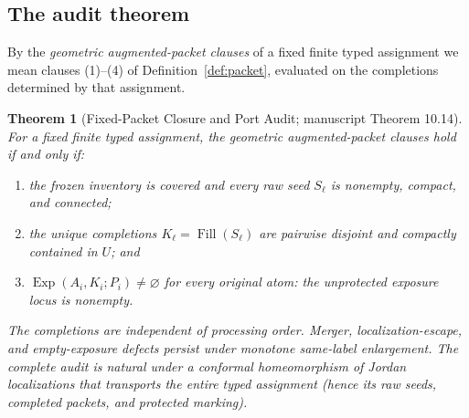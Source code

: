 \documentclass[11pt,reqno]{amsart}
\newtheorem{theorem}{Theorem}[section]
\theoremstyle{definition}
\theoremstyle{remark}
\newcommand{\Fill}{\operatorname{Fill}}
\newcommand{\Exp}{\operatorname{Exp}}
\begin{document}
\subsection{The audit theorem}\label{subsec:E-audit-thm}

By the \emph{geometric augmented-packet clauses} of a fixed finite typed assignment
we mean clauses (1)--(4) of Definition~\ref{def:packet}, evaluated on the completions
determined by that assignment.

\begin{theorem}[Fixed-Packet Closure and Port Audit; manuscript Theorem
10.14]\label{thm:audit}
For a fixed finite typed assignment, the geometric augmented-packet clauses hold if
and only if:
\begin{enumerate}
\item the frozen inventory is covered and every raw seed $S_\ell$ is
nonempty, compact, and connected;
\item the unique completions $K_\ell=\Fill(S_\ell)$ are pairwise disjoint and
compactly contained in $U$; and
\item $\Exp(A_i,K_i;P_i)\neq\varnothing$ for every original atom: the
unprotected exposure locus is nonempty.
\end{enumerate}
The completions are independent of processing order. Merger, localization-escape, and
empty-exposure defects persist under monotone same-label enlargement. The complete
audit is natural under a conformal homeomorphism of Jordan localizations that
transports the entire typed assignment (hence its raw seeds, completed packets,
and protected marking).
\end{theorem}
\end{document}

